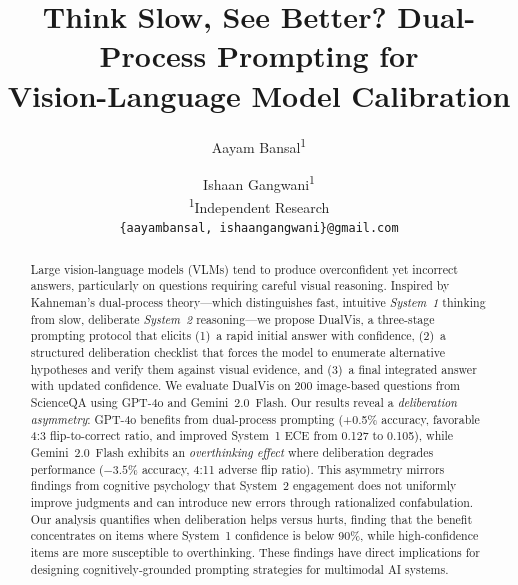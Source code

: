 \documentclass{cvpr}
\newcommand{\method}{DualVis}
\begin{document}
\title{Think Slow, See Better? Dual-Process Prompting for\\Vision-Language Model Calibration}

\author{Aayam Bansal\textsuperscript{1} \and Ishaan Gangwani\textsuperscript{1}\\
\textsuperscript{1}Independent Research\\
{\tt\small \{aayambansal, ishaangangwani\}@gmail.com}}

\maketitle

\begin{abstract}
Large vision-language models (VLMs) tend to produce overconfident yet incorrect answers, particularly on questions requiring careful visual reasoning. Inspired by Kahneman's dual-process theory---which distinguishes fast, intuitive \emph{System~1} thinking from slow, deliberate \emph{System~2} reasoning---we propose \method{}, a three-stage prompting protocol that elicits (1)~a rapid initial answer with confidence, (2)~a structured deliberation checklist that forces the model to enumerate alternative hypotheses and verify them against visual evidence, and (3)~a final integrated answer with updated confidence. We evaluate \method{} on 200 image-based questions from ScienceQA using GPT-4o and Gemini~2.0~Flash. Our results reveal a \emph{deliberation asymmetry}: GPT-4o benefits from dual-process prompting (+0.5\% accuracy, favorable 4:3 flip-to-correct ratio, and improved System~1 ECE from 0.127 to 0.105), while Gemini~2.0~Flash exhibits an \emph{overthinking effect} where deliberation degrades performance ($-3.5$\% accuracy, 4:11 adverse flip ratio). This asymmetry mirrors findings from cognitive psychology that System~2 engagement does not uniformly improve judgments and can introduce new errors through rationalized confabulation. Our analysis quantifies when deliberation helps versus hurts, finding that the benefit concentrates on items where System~1 confidence is below 90\%, while high-confidence items are more susceptible to overthinking. These findings have direct implications for designing cognitively-grounded prompting strategies for multimodal AI systems.
\end{abstract}
\end{document}
